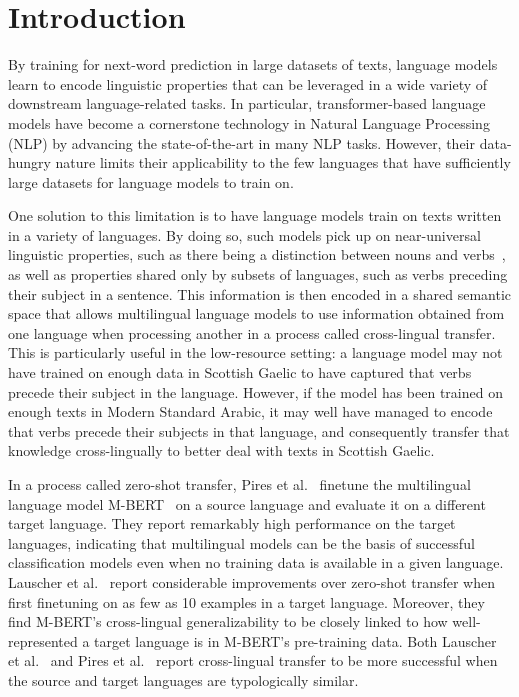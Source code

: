 
\section{Introduction}
\label{sec:introduction}
	By training for next-word prediction in large datasets of texts, language models learn to encode linguistic properties that can be leveraged in a wide variety of downstream language-related tasks. In particular, transformer-based language models have become a cornerstone technology in Natural Language Processing (NLP) by advancing the state-of-the-art in many NLP tasks. However, their data-hungry nature limits their applicability to the few languages that have sufficiently large datasets for language models to train on.

	One solution to this limitation is to have language models train on texts written in a variety of languages. By doing so, such models pick up on near-universal linguistic properties, such as there being a distinction between nouns and verbs~\cite{evans-2009-myth}, as well as properties shared only by subsets of languages, such as verbs preceding their subject in a sentence. This information is then encoded in a shared semantic space that allows multilingual language models to use information obtained from one language when processing another in a process called cross-lingual transfer. This is particularly useful in the low-resource setting: a language model may not have trained on enough data in Scottish Gaelic to have captured that verbs precede their subject in the language. However, if the model has been trained on enough texts in Modern Standard Arabic, it may well have managed to encode that verbs precede their subjects in that language, and consequently transfer that knowledge cross-lingually to better deal with texts in Scottish Gaelic.

	In a process called zero-shot transfer, Pires et al.~\cite{pires-etal-2019-multilingual} finetune the multilingual language model M-BERT~\cite{devlin-etal-2019-bert} on a source language and evaluate it on a different target language. They report remarkably high performance on the target languages, indicating that multilingual models can be the basis of successful classification models even when no training data is available in a given language. Lauscher et al.~\cite{lauscher-etal-2020-zero} report considerable improvements over zero-shot transfer when first finetuning on as few as 10 examples in a target language. Moreover, they find M-BERT's cross-lingual generalizability to be closely linked to how well-represented a target language is in M-BERT's pre-training data. Both Lauscher et al.~\cite{lauscher-etal-2020-zero} and Pires et al.~\cite{pires-etal-2019-multilingual} report cross-lingual transfer to be more successful when the source and target languages are typologically similar.

